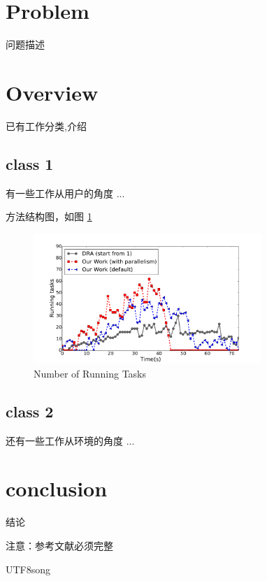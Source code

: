 \documentclass[sigconf]{acmart}
\begin{document}
\begin{CJK}{UTF8}{song}
\section{Problem}
问题描述

\section{Overview}
已有工作分类,介绍

\subsection{class 1}
有一些工作从用户的角度 ...



方法结构图，如图 \ref{fig:tasks} 
\begin{figure}[htbp]
\centering
\includegraphics[width=3.4in]{./figure/tasks.pdf}
\caption{Number of Running Tasks}\label{fig:tasks}
\end{figure}

\subsection{class 2}
还有一些工作从环境的角度 ...

\section{conclusion}
结论

注意：参考文献必须完整



 

\end{CJK}{UTF8}{song}
\end{document}
